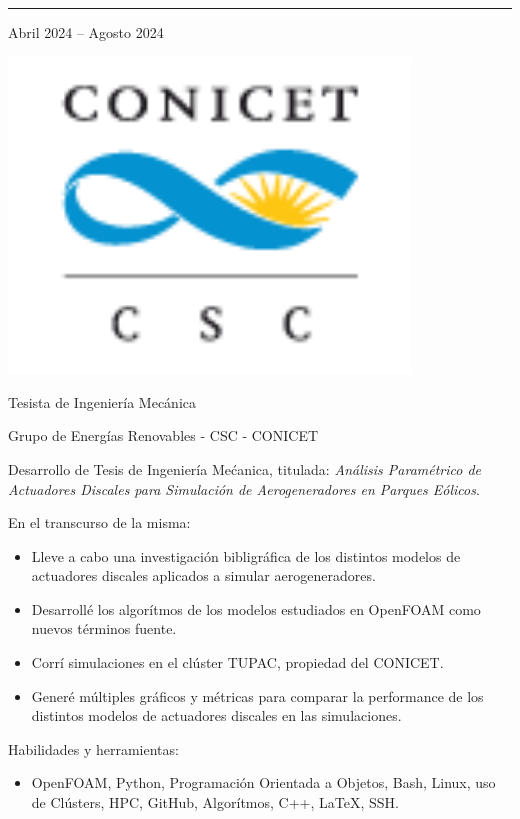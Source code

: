 \documentclass[a4paper,10pt]{article}
\newlength{\cvcolumngapwidth}
\newlength{\cvleftcolumnwidth}
\newlength{\cvrightcolumnwidth}
\newcommand{\cvsectionstyle}[1]{{\normalsize\cvsectionfont\textcolor{cvsectioncolor}{#1}}}
\newcommand{\cvtitlestyle}[1]{{\large\cvtitlefont\textcolor{cvtitlecolor}{#1}}}
\newcommand{\cvsubtitlestyle}[1]{{\cvtitlefont\textcolor{cvtitlecolor}{#1}}}
\newcommand{\cvdurationstyle}[1]{{\small\cvdurationfont\textcolor{cvdurationcolor}{#1}}}
\newlength{\cvafteritemskipamount}
\newlength{\cvaftersectionskipamount}
\newlength{\cvaftertitleskipamount}
\newlength{\cvparskip}
\newcommand{\cvsection}[1]{
    \begin{minipage}[t]{\cvleftcolumnwidth}
        \raggedleft\cvsectionstyle{#1}
    \end{minipage}%
    \hspace{\cvcolumngapwidth}%
    \begin{minipage}[t]{\cvrightcolumnwidth}
        \textcolor{cvrulecolor}{\rule{\cvrightcolumnwidth}{0.3mm}}
    \end{minipage}

    \vspace{\cvaftersectionskipamount}
}
\newcommand{\cvitem}[2]{
    \begin{minipage}[t]{\cvleftcolumnwidth}
        \raggedleft #1
    \end{minipage}%
    \hspace{\cvcolumngapwidth}%
    \begin{minipage}[t]{\cvrightcolumnwidth}
        \setlength{\parskip}{\cvparskip} #2
    \end{minipage}

    \vspace{\cvafteritemskipamount}
}
\newcommand{\cvtitle}[1]{
    \cvtitlestyle{#1}

    \vspace{\cvaftertitleskipamount}
    \vspace{-\cvparskip}
}
\begin{document}
\cvsection{EXPERIENCIA LABORAL}

\cvitem{
	\cvdurationstyle{Abril 2024 -- Agosto 2024}
}{
	\begin{minipage}{0.1\textwidth}
		\centering
		\includegraphics[width=0.8\textwidth]{../logos-photos/Logo_CSC.png}   
	\end{minipage}
	\cvtitle{Tesista de Ingeniería Mecánica}
	
	\cvsubtitlestyle{Grupo de Energías Renovables - CSC - CONICET}

    Desarrollo de Tesis de Ingeniería Mećanica, titulada: \textit{Análisis Paramétrico de Actuadores Discales para Simulación
    de Aerogeneradores en Parques Eólicos}.

    En el transcurso de la misma:
    \begin{itemize}
        \item Lleve a cabo una investigación bibligráfica de los distintos modelos de actuadores discales aplicados a simular aerogeneradores.
        \item Desarrollé los algorítmos de los modelos estudiados en OpenFOAM como nuevos términos fuente.
        \item Corrí simulaciones en el clúster TUPAC, propiedad del CONICET.
        \item Generé múltiples gráficos y métricas para comparar la performance de los distintos modelos de actuadores discales en las simulaciones.
    \end{itemize}

    Habilidades y herramientas:
    \begin{itemize}
        \item OpenFOAM, Python, Programación Orientada a Objetos, Bash, Linux, uso de Clústers, HPC, GitHub, Algorítmos,
            C++, LaTeX, SSH.
    \end{itemize}
}
\end{document}
